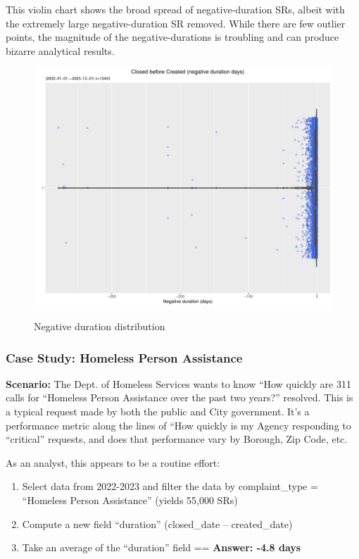 \documentclass[12pt, titlepage]{article}
\begin{document}
{This violin chart shows the broad spread of negative-duration SRs, albeit with the extremely large 
negative-duration SR removed. While there are few outlier points, the magnitude of the negative-durations
is troubling and can produce bizarre analytical results.

\begin{figure}[tbp]
 	 \centering
 	 \caption{Negative duration distribution}
	  \includegraphics[width = \textwidth]{negative_duration_SR_violin.pdf}
	  \label{fig:negative-duration-violin}
\end{figure}


\subsubsection{Case Study: Homeless Person Assistance}
		\textbf{Scenario:} The Dept. of Homeless Services wants to know ``How quickly are 311 calls for ``Homeless Person
		Assistance over the past two years?'' resolved. This is a typical request made by both the public and City government. It's a performance metric along the lines
		of ``How quickly is my Agency responding to ``critical'' requests, and does that performance vary by Borough, Zip Code, etc. 

		As an analyst, this appears to be a routine effort: 
		
		\begin{enumerate}
		    \item Select data from 2022-2023 and filter the data by complaint\_type = ``Homeless Person Assistance'' (yields 55,000 SRs)
		    \item Compute a new field ``duration'' (closed\_date – created\_date)
		    \item Take an average of the ``duration'' field == \textbf{Answer:  -4.8 days}  
		\end{enumerate}
		
}
\end{document}
